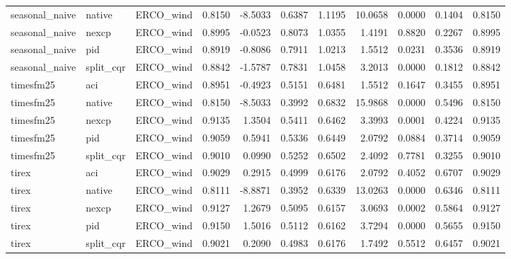 \begin{tabular}{lllrrrrrrrr}
seasonal_naive & native & ERCO_wind & 0.8150 & -8.5033 & 0.6387 & 1.1195 & 10.0658 & 0.0000 & 0.1404 & 0.8150 \\
seasonal_naive & nexcp & ERCO_wind & 0.8995 & -0.0523 & 0.8073 & 1.0355 & 1.4191 & 0.8820 & 0.2267 & 0.8995 \\
seasonal_naive & pid & ERCO_wind & 0.8919 & -0.8086 & 0.7911 & 1.0213 & 1.5512 & 0.0231 & 0.3536 & 0.8919 \\
seasonal_naive & split_cqr & ERCO_wind & 0.8842 & -1.5787 & 0.7831 & 1.0458 & 3.2013 & 0.0000 & 0.1812 & 0.8842 \\
timesfm25 & aci & ERCO_wind & 0.8951 & -0.4923 & 0.5151 & 0.6481 & 1.5512 & 0.1647 & 0.3455 & 0.8951 \\
timesfm25 & native & ERCO_wind & 0.8150 & -8.5033 & 0.3992 & 0.6832 & 15.9868 & 0.0000 & 0.5496 & 0.8150 \\
timesfm25 & nexcp & ERCO_wind & 0.9135 & 1.3504 & 0.5411 & 0.6462 & 3.3993 & 0.0001 & 0.4224 & 0.9135 \\
timesfm25 & pid & ERCO_wind & 0.9059 & 0.5941 & 0.5336 & 0.6449 & 2.0792 & 0.0884 & 0.3714 & 0.9059 \\
timesfm25 & split_cqr & ERCO_wind & 0.9010 & 0.0990 & 0.5252 & 0.6502 & 2.4092 & 0.7781 & 0.3255 & 0.9010 \\
tirex & aci & ERCO_wind & 0.9029 & 0.2915 & 0.4999 & 0.6176 & 2.0792 & 0.4052 & 0.6707 & 0.9029 \\
tirex & native & ERCO_wind & 0.8111 & -8.8871 & 0.3952 & 0.6339 & 13.0263 & 0.0000 & 0.6346 & 0.8111 \\
tirex & nexcp & ERCO_wind & 0.9127 & 1.2679 & 0.5095 & 0.6157 & 3.0693 & 0.0002 & 0.5864 & 0.9127 \\
tirex & pid & ERCO_wind & 0.9150 & 1.5016 & 0.5112 & 0.6162 & 3.7294 & 0.0000 & 0.5655 & 0.9150 \\
tirex & split_cqr & ERCO_wind & 0.9021 & 0.2090 & 0.4983 & 0.6176 & 1.7492 & 0.5512 & 0.6457 & 0.9021 \\
\bottomrule
\end{tabular}
